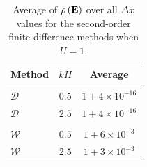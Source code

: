 \begin{table}
	\centering
	\begin{tabular}{l  c  c}
		Method & $kH$& Average\\
		\hline && \\
		$\mathcal{D}$ & $0.5$ & $1+ 4\times 10^{-16}$  \\
		$\mathcal{D}$ & $2.5$ & $1+ 4\times 10^{-16}$  \\
		\hline \\
		$\mathcal{W}$ & $0.5$ & $1+ 6\times 10^{-3}$  \\
		$\mathcal{W}$ & $2.5$ & $1+ 3\times 10^{-3}$   \\
	\end{tabular}
	\caption{Average of $\rho\left(\mathbf{E}\right)$ over all $\Delta x$ values for the second-order finite difference methods when $U=1$.}
	\label{tab:Averageofspectralradiusu=1}
\end{table}